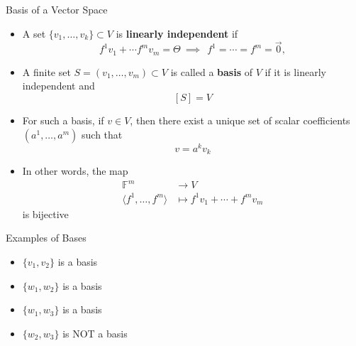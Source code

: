 \documentclass[usenames,dvipsnames,10pt]{beamer}
\newcommand\F{\mathbb{F}}
\newcommand\zero{\vec{0}}
\begin{document}
\begin{frame}
  {Basis of a Vector Space}

  \begin{itemize}
  \item A set $\{v_1, \dots, v_k \} \subset V$ is {\bf linearly independent} if
    \begin{equation}\label{independence}
      f^1v_1 + \cdots f^mv_m = \Theta\ \implies\ \ f^1 =\cdots = f^m = \zero,
    \end{equation}
  \item A finite set $S = (v_1, \dots, v_m) \subset V$ is called a {\bf basis} of $V$ if it is linearly independent and
    \[ [S] = V \]
  \item For such a basis, if $v \in V$, then there exist a unique set of scalar coefficients $(a^1, \dots, a^m)$ such that
    \[
      v = a^kv_k
    \]
  \item In other words, the map
    \begin{align*}
      \F^m &\rightarrow V\\
      \langle f^1, \dots, f^m\rangle &\mapsto f^1v_1 + \cdots + f^mv_m
    \end{align*}
    is bijective
  \end{itemize}
\end{frame}

\begin{frame}
  {Examples of Bases}

  \begin{center}
  \end{center}

  \begin{itemize}
  \item $\{ v_1,v_2\}$ is a basis
  \item $\{ w_1,w_2\}$ is a basis
  \item $\{ w_1,w_3\}$ is a basis
  \item $\{ w_2,w_3\}$ is NOT a basis
  \end{itemize}
\end{frame}
\end{document}
